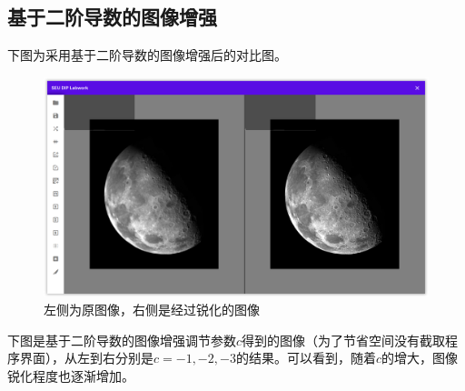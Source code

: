 \documentclass{article}
\begin{document}
\subsection{基于二阶导数的图像增强}

下图为采用基于二阶导数的图像增强后的对比图。

\begin{figure}[H]
    \includegraphics[width=\textwidth]{img/laplace-sharpening.png}
    \caption{左侧为原图像，右侧是经过锐化的图像}
\end{figure}

下图是基于二阶导数的图像增强调节参数$c$得到的图像（为了节省空间没有截取程序界面），从左到右分别是$c=-1, -2, -3$的结果。可以看到，随着$c$的增大，图像锐化程度也逐渐增加。
\end{document}
